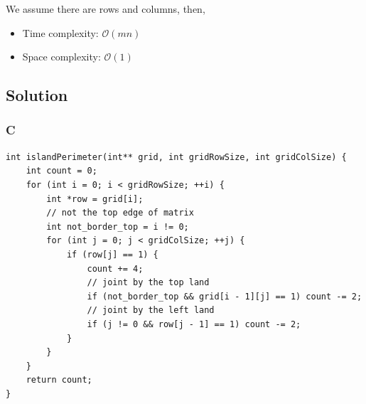 We assume there are  rows and  columns, then,
\begin{itemize}
    \item Time complexity: $\mathcal{O}(mn)$
    \item Space complexity: $\mathcal{O}(1)$
\end{itemize}

\subsection*{Solution}
\subsubsection{C}
\begin{verbatim}
int islandPerimeter(int** grid, int gridRowSize, int gridColSize) {
    int count = 0;
    for (int i = 0; i < gridRowSize; ++i) {
        int *row = grid[i];
        // not the top edge of matrix
        int not_border_top = i != 0;
        for (int j = 0; j < gridColSize; ++j) {
            if (row[j] == 1) {
                count += 4;
                // joint by the top land
                if (not_border_top && grid[i - 1][j] == 1) count -= 2;
                // joint by the left land
                if (j != 0 && row[j - 1] == 1) count -= 2;
            }
        }
    }
    return count;
}
\end{verbatim}

\newpage

